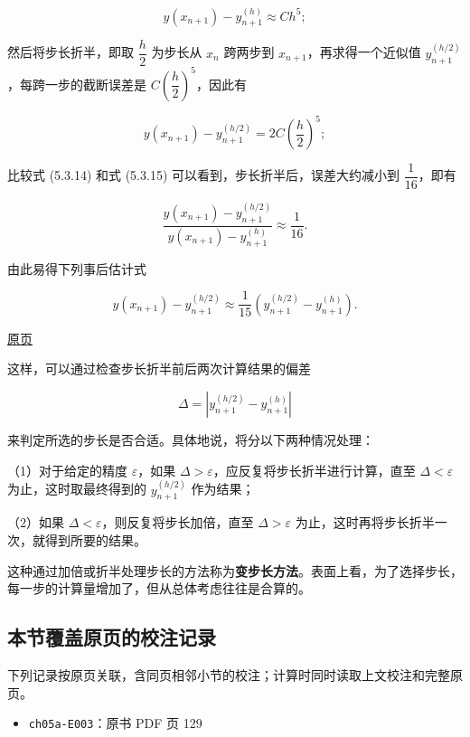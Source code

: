 \documentclass[
  10pt,
  fontset=fandol]{ctexart}
\providecommand{\tightlist}{%
  \setlength{\itemsep}{0pt}\setlength{\parskip}{0pt}}
\begin{document}
\[
y(x_{n+1})-y_{n+1}^{(h)}\approx Ch^5;\tag{5.3.14}
\]

然后将步长折半，即取 \(\dfrac{h}{2}\) 为步长从 \(x_n\) 跨两步到 \(x_{n+1}\)，再求得一个近似值 \(y_{n+1}^{(h/2)}\)，每跨一步的截断误差是 \(C\left(\dfrac{h}{2}\right)^5\)，因此有

\[
y(x_{n+1})-y_{n+1}^{(h/2)}=2C\left(\frac{h}{2}\right)^5;\tag{5.3.15}
\]

比较式 (5.3.14) 和式 (5.3.15) 可以看到，步长折半后，误差大约减小到 \(\dfrac{1}{16}\)，即有

\[
\frac{y(x_{n+1})-y_{n+1}^{(h/2)}}{y(x_{n+1})-y_{n+1}^{(h)}}\approx\frac{1}{16}.
\]

由此易得下列事后估计式

\[
y(x_{n+1})-y_{n+1}^{(h/2)}\approx\frac{1}{15}(y_{n+1}^{(h/2)}-y_{n+1}^{(h)}).
\]

\href{../../source-images/pdf-133.jpeg}{原页}

这样，可以通过检查步长折半前后两次计算结果的偏差

\[
\Delta=|y_{n+1}^{(h/2)}-y_{n+1}^{(h)}|
\]

来判定所选的步长是否合适。具体地说，将分以下两种情况处理：

（1）对于给定的精度 \(\varepsilon\)，如果 \(\Delta>\varepsilon\)，应反复将步长折半进行计算，直至 \(\Delta<\varepsilon\) 为止，这时取最终得到的 \(y_{n+1}^{(h/2)}\) 作为结果；

（2）如果 \(\Delta<\varepsilon\)，则反复将步长加倍，直至 \(\Delta>\varepsilon\) 为止，这时再将步长折半一次，就得到所要的结果。

这种通过加倍或折半处理步长的方法称为\textbf{变步长方法}。表面上看，为了选择步长，每一步的计算量增加了，但从总体考虑往往是合算的。

\subsection{本节覆盖原页的校注记录}\label{ux672cux8282ux8986ux76d6ux539fux9875ux7684ux6821ux6ce8ux8bb0ux5f55}

下列记录按原页关联，含同页相邻小节的校注；计算时同时读取上文校注和完整原页。

\begin{itemize}
\tightlist
\item
  \texttt{ch05a-E003}：原书 PDF 页 129
\end{itemize}
\end{document}
